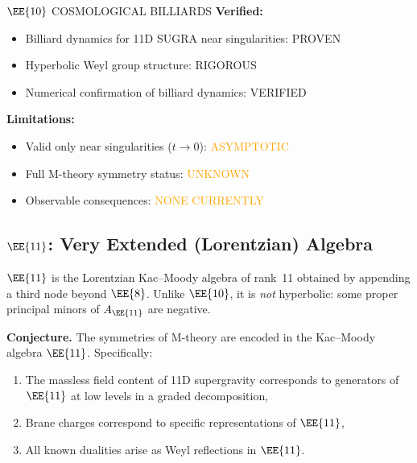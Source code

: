 \begin{factcheck}{$\EE{10}$ COSMOLOGICAL BILLIARDS}
\textbf{Verified:}
\begin{itemize}
    \item Billiard dynamics for 11D SUGRA near singularities:
          \textcolor{validcolor}{PROVEN}~\cite{damour2002e10}
    \item Hyperbolic Weyl group structure:
          \textcolor{validcolor}{RIGOROUS}
    \item Numerical confirmation of billiard dynamics:
          \textcolor{validcolor}{VERIFIED}
\end{itemize}

\textbf{Limitations:}
\begin{itemize}
    \item Valid only near singularities ($t \to 0$):
          \textcolor{orange}{ASYMPTOTIC}
    \item Full M-theory symmetry status: \textcolor{orange}{UNKNOWN}
    \item Observable consequences: \textcolor{orange}{NONE CURRENTLY}
\end{itemize}
\end{factcheck}

\subsection{$\EE{11}$: Very Extended (Lorentzian) Algebra}

\begin{definition}[$\EE{11}$]
\label{def:e11}
$\EE{11}$ is the Lorentzian Kac--Moody algebra of rank~11 obtained by
appending a third node beyond $\EE{8}$.  Unlike $\EE{10}$, it is
\emph{not} hyperbolic: some proper principal minors of $A_{\EE{11}}$ are
negative.
\end{definition}

\begin{theorem}
\label{thm:e11_conjecture}
\textbf{Conjecture.} The symmetries of M-theory are encoded in the
Kac--Moody algebra $\EE{11}$.  Specifically:
\begin{enumerate}
    \item The massless field content of 11D supergravity corresponds to
          generators of $\EE{11}$ at low levels in a graded decomposition,
    \item Brane charges correspond to specific representations of $\EE{11}$,
    \item All known dualities arise as Weyl reflections in $\EE{11}$.
\end{enumerate}
\end{theorem}

